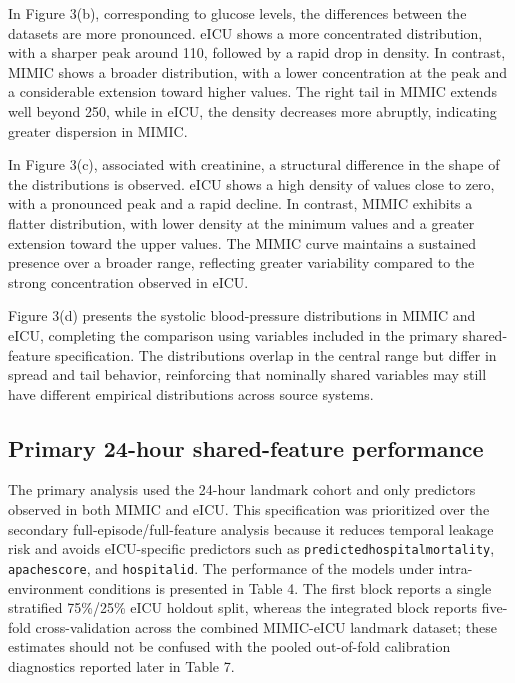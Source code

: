 \documentclass[utf8]{FrontiersinHarvard} %
\begin{document}
In Figure 3(b), corresponding to glucose levels, the differences between the datasets are more pronounced. eICU shows a more concentrated distribution, with a sharper peak around 110, followed by a rapid drop in density. In contrast, MIMIC shows a broader distribution, with a lower concentration at the peak and a considerable extension toward higher values. The right tail in MIMIC extends well beyond 250, while in eICU, the density decreases more abruptly, indicating greater dispersion in MIMIC.

In Figure 3(c), associated with creatinine, a structural difference in the shape of the distributions is observed. eICU shows a high density of values close to zero, with a pronounced peak and a rapid decline. In contrast, MIMIC exhibits a flatter distribution, with lower density at the minimum values and a greater extension toward the upper values. The MIMIC curve maintains a sustained presence over a broader range, reflecting greater variability compared to the strong concentration observed in eICU.

Figure 3(d) presents the systolic blood-pressure distributions in MIMIC and eICU, completing the comparison using variables included in the primary shared-feature specification. The distributions overlap in the central range but differ in spread and tail behavior, reinforcing that nominally shared variables may still have different empirical distributions across source systems.

\subsection{Primary 24-hour shared-feature performance}

The primary analysis used the 24-hour landmark cohort and only predictors observed in both MIMIC and eICU. This specification was prioritized over the secondary full-episode/full-feature analysis because it reduces temporal leakage risk and avoids eICU-specific predictors such as \texttt{predictedhospitalmortality}, \texttt{apachescore}, and \texttt{hospitalid}. The performance of the models under intra-environment conditions is presented in Table 4. The first block reports a single stratified 75\%/25\% eICU holdout split, whereas the integrated block reports five-fold cross-validation across the combined MIMIC-eICU landmark dataset; these estimates should not be confused with the pooled out-of-fold calibration diagnostics reported later in Table 7.
\end{document}

